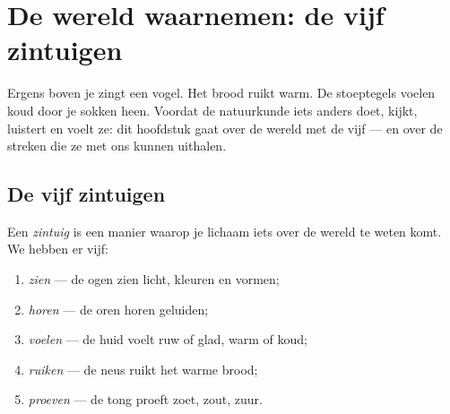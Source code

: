 \chapter{De wereld waarnemen: de vijf zintuigen}\label{ch:g1:five-senses}

Ergens boven je zingt een vogel. Het brood ruikt warm. De stoeptegels
voelen koud door je sokken heen. Voordat de natuurkunde iets anders
doet, kijkt, luistert en voelt ze: dit hoofdstuk gaat over de wereld
 met de vijf  --- en over de streken die ze met ons
kunnen uithalen.

\section{De vijf zintuigen}

\begin{definition}\label{def:g1:five-senses:senses}
Een \emph{zintuig} is een manier waarop je lichaam iets
over de wereld te weten komt. We hebben er vijf:
\begin{enumerate}
  \item \emph{zien} --- de ogen zien licht, kleuren en
        vormen;
  \item \emph{horen} --- de oren horen geluiden;
  \item \emph{voelen} --- de huid voelt ruw of glad,
        warm of koud;
  \item \emph{ruiken} --- de neus ruikt het warme brood;
  \item \emph{proeven} --- de tong proeft zoet, zout,
        zuur.
\end{enumerate}
\end{definition}

